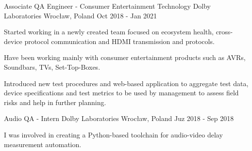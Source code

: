 \begin{cventries}
  \cventry
  {Associate QA Engineer - Consumer Entertainment Technology} %
  {Dolby Laboratories} %
  {Wrocław, Poland} %
  {Oct 2018 - Jan 2021} %
  {
    \begin{cvitems} %
      \item {Started working in a newly created team focused on ecosystem health, cross-device protocol communication and HDMI transmission and protocols.}
      \item {Have been working mainly with consumer entertainment products such as AVRs, Soundbars, TVs, Set-Top-Boxes.}
      \item {Introduced new test procedures and web-based application to aggregate test data, device specifications and test metrics to be used by management to assess field risks and help in further planning.}
    \end{cvitems}
  }

  \cventry
  {Audio QA - Intern} %
  {Dolby Laboratories} %
  {Wrocław, Poland} %
  {Juz 2018 - Sep 2018} %
  {
    \begin{cvitems} %
      \item {I was involved in creating a Python-based toolchain for audio-video delay measurement automation.}
    \end{cvitems}
  }

\end{cventries}
